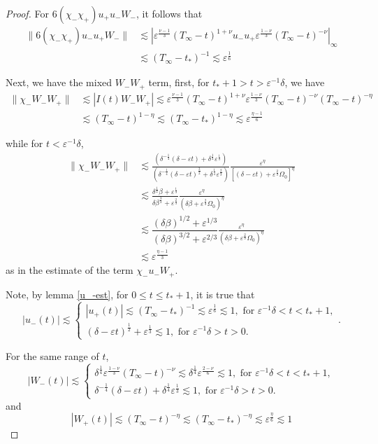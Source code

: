 \documentclass[letterpaper,11pt]{article}
\newcommand{\eps}{\varepsilon}
\newcommand{\lar}{ \lesssim }
\numberwithin{equation}{section}
\theoremstyle{plain}
\begin{document}
\begin{itemize}
\begin{enumerate}
\begin{proof}
For $6(\chi_-\chi_+)u_+u_-W_-$, it follows that
\begin{align*}
\|6(\chi_-\chi_+)u_-u_+W_- \| &\lar |\eps^{\frac{\nu-1}{3}} (T_\infty-t)^{1+\nu}u_-u_+ \eps^{\frac{1-\nu}{3}}(T_\infty-t)^{-\nu} |_{\infty} \\
& \lar (T_\infty-t_*)^{-1} \lar \eps^{\frac{1}{6}}
\end{align*}

Next, we have the mixed $W_-W_+$ term, first, 
for $t_*+1> t >\eps^{-1}\delta$, we have
\begin{align*}
\|\chi_-W_- W_+ \| &\lar |I(t)W_-W_+| \lar \eps^{\frac{\nu-1}{3}} (T_\infty-t)^{1+\nu} \eps^{\frac{1-\nu}{3}} (T_\infty-t)^{-\nu} (T_\infty-t)^{-\eta} \\
& \lar (T_\infty-t)^{1-\eta} \lar (T_\infty-t_*)^{1-\eta} \lar \eps^{\frac{\eta-1}{6}}
\end{align*}

while for $t < \eps^{-1}\delta$, 
\begin{align*}
\|\chi_-W_- W_+ \| & \lar \frac{\left( \delta^{-\frac{1}{4}}(\delta-\eps t)+\delta^{\frac{1}{4}}\eps^{\frac{1}{3}} \right) }{\left(\delta^{-\frac{1}{4}}(\delta-\eps t)^{\frac{3}{2}} +\delta^{\frac{1}{4}} \eps^{\frac{2}{3}} \right)} \frac{\eps^{\eta}}{[(\delta-\eps t)+\eps^{\frac{2}{3}}\Omega_0]^{\eta}} \\
& \lar \frac{\delta^{\frac{1}{2}}\beta+\eps^{\frac{1}{3}}}{\delta\beta^{\frac{3}{2}}+\eps^{\frac{2}{3}}}\frac{\eps^\eta}{(\delta \beta + \eps^{\frac{2}{3}}\Omega_0)^\eta}   \\
& \lar \dfrac{(\delta \beta)^{1/2} + \eps^{1/3}} {(\delta \beta)^{3/2} + \eps^{2/3}}\frac{\eps^\eta}{(\delta \beta + \eps^{\frac{2}{3}}\Omega_0)^\eta}\\
&\lar \eps^{\frac{\eta-1}{3}} 
\end{align*}
as in the estimate of the term $\chi_-u_-W_+$.

Note, by lemma \ref{u_-est}, for $0\le t \le t_*+1$, it is true that 
\[
|u_-(t)| \lar \begin{cases}
 |u_+(t)| \lar (T_\infty-t_*)^{-1}\lar \eps^{\frac{1}{6}}\lar 1, \text{ for }\eps^{-1}\delta < t < t_*+1,\\
 (\delta-\eps t)^{\frac{1}{2}}+\eps^{\frac{1}{3}}\lar 1, \text{ for }\eps^{-1}\delta > t > 0.
\end{cases}.
\]

For the same range of $t$,
\[
|W_-(t)| \lar\begin{cases}
 \delta^{\frac{1}{4}}\eps^{\frac{1-\nu}{3}}(T_\infty-t)^{-\nu} \lar \delta^{\frac{1}{4}}\eps^{\frac{2-\nu}{6}} \lar 1, \text{ for }\eps^{-1}\delta < t < t_*+1,\\
 \delta^{-\frac{1}{4}}(\delta-\eps t)+\delta^{\frac{1}{4}}\eps^{\frac{1}{3}} \lar 1, \text{ for }\eps^{-1}\delta > t > 0.
\end{cases}
\]
and 
\[
|W_+(t)| \lar (T_\infty-t)^{-\eta} \lar (T_\infty-t_*)^{-\eta} \lar \eps^{\frac{\eta}{6}} \lar 1
\]


\end{proof}
\end{enumerate}
\end{itemize}
\end{document}
